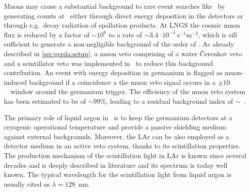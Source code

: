 Muons may cause a substantial background to rare event searches like \gerda\ by generating
counts at \qbb\ either through direct energy deposition in the detectors or through
e.g.~decay radiation of spallation products. At LNGS the cosmic muon flux is reduced by a
factor of ${\sim}10^6$ to a rate of ${\sim}3.4 \cdot 10^{−4}~\text{s}^{-1}\text{m}^{-2}$,
which is sill sufficient to generate a non-negligible background of the order of
.  As already described in \cref{sec:gerda:setup}, a muon veto comprising of
a water \v{C}erenkov veto and a scintillator veto was implemented in \gerda\ to reduce
this background contribution. An event with energy deposition in germanium is flagged
as muon-induced background if a coincidence a the muon veto signal occurs in a $\pm
10$~\mus\ window around the germanium trigger. The efficiency of the muon veto system
has been estimated to be of ${\sim}99$\%, leading to a residual background index of
${\sim}$~\cite{Freund2016}.

The primary role of liquid argon in \gerda\ is to keep the germanium detectors at a
cryogenic operational temperature and provide a passive shielding medium against external
backgrounds. Moreover, the LAr can be also employed as a detector medium in an active veto
system, thanks to its scintillation properties. The production mechanism of the
scintillation light in LAr is known since several decades and is deeply described in
literature and its spectrum is today well known. The typical wavelength for the
scintillation light from liquid argon is usually cited as $\lambda = 128$~nm.

